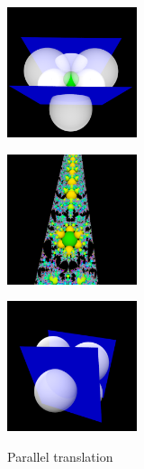 \begin{figure}[h!tbp]
 \begin{minipage}{0.49\hsize}
  \begin{minipage}{0.24\hsize}
   \center
   \includegraphics[width=1.5in, height=1.5in, keepaspectratio]{../img/klein/3diis/translationGen.pdf}
   \label{fig:translationGen}
  \end{minipage}
  \hspace*{\fill}
  \begin{minipage}{0.24\hsize}
   \center
   \includegraphics[width=1.5in, height=1.5in, keepaspectratio]{../img/klein/3diis/translationOrbit.pdf}
   \label{fig:translationOrb}
  \end{minipage}
  \hspace*{\fill}
  \caption{Parallel translation}
  \label{fig:translation3d}
 \end{minipage}
 \begin{minipage}{0.49\hsize}
  \begin{minipage}{0.24\hsize}
   \center
   \includegraphics[width=1.5in, height=1.5in, keepaspectratio]{../img/klein/3diis/compParabolicGen.pdf}
   \label{fig:compParabolicGen}
  \end{minipage}
  \hspace*{\fill}

\end{minipage}
\end{figure}
